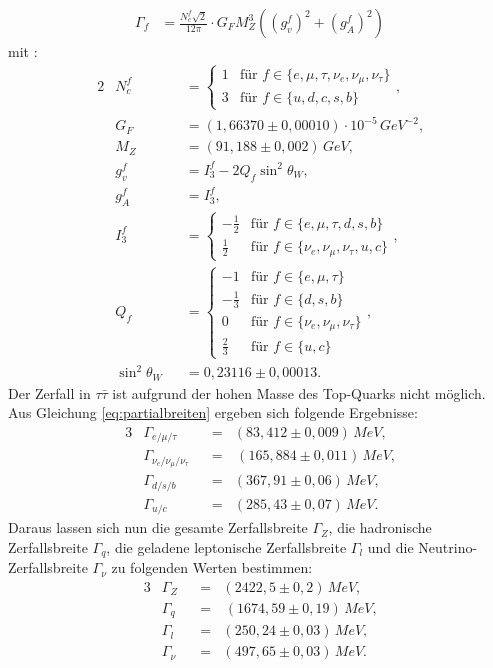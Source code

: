 \begin{align}
	\Gamma_f&=\frac{N_c^f\sqrt2}{12\pi}\cdot G_FM_Z^3\left(\left(g_v^f\right)^2+\left(g_A^f\right)^2\right)\label{eq:partialbreiten}
\end{align}
mit \cite{anleitungalt,nakamura}:
\begin{alignat}{2}
	&N_c^f&&=
	\begin{cases}
		1&\text{für } f\in\{e, \mu, \tau, \nu_e, \nu_\mu, \nu_\tau\}\\
		3&\text{für } f\in\{u, d, c, s, b\}
	\end{cases}\text{,}\\
	&G_F&&=(1,66370\pm0,00010)\cdot10^{-5}\,\si{GeV^{-2}}\text{,}\\
	&M_Z&&=(91,188\pm0,002)\,\si{GeV}\text{,}\\
	&g_v^f&&=I_3^f-2Q_f\sin^2\theta_W\text{,}\\
	&g_A^f&&=I_3^f\text{,}\\
	&I_3^f&&=
	\begin{cases}
		-\frac12&\text{für } f\in\{e, \mu, \tau, d, s, b\}\\
		\frac12&\text{für } f\in\{\nu_e, \nu_\mu, \nu_\tau, u, c\}
	\end{cases}\text{,}\\
	&Q_f&&=
	\begin{cases}
		-1&\text{für } f\in\{e, \mu, \tau\}\\
		-\frac13&\text{für } f\in\{d, s, b\}\\
		0&\text{für } f\in\{\nu_e, \nu_\mu, \nu_\tau\}\\
		\frac23&\text{für } f\in\{u, c\}
	\end{cases}\text{,}\\
	&\sin^2\theta_W&&=0,23116\pm0,00013\text{.}
\end{alignat}
Der Zerfall in $\tau\bar\tau$ ist aufgrund der hohen Masse des Top-Quarks nicht möglich.\\

Aus Gleichung \ref{eq:partialbreiten} ergeben sich folgende Ergebnisse:
\begin{alignat}{3}
	&\Gamma_{e/\mu/\tau}&&=&(83,412\pm0,009)\,\si{MeV}\text{,}\label{eq:leptonenuniversalitaet}\\
	&\Gamma_{\nu_e/\nu_\mu/\nu_\tau}&&=&\,(165,884\pm0,011)\,\si{MeV}\text{,}\label{eq:neutrinos}\\
	&\Gamma_{d/s/b}&&=&(367,91\pm0,06)\,\si{MeV}\text{,}\\
	&\Gamma_{u/c}&&=&(285,43\pm0,07)\,\si{MeV}\text{.}
\end{alignat}
Daraus lassen sich nun die gesamte Zerfallsbreite $\Gamma_Z$, die hadronische Zerfallsbreite $\Gamma_q$, die geladene leptonische Zerfallsbreite $\Gamma_l$ und die Neutrino-Zerfallsbreite $\Gamma_\nu$ zu folgenden Werten bestimmen:
\begin{alignat}{3}
	&\Gamma_Z&&=&(2422,5\pm0,2)\,\si{MeV}\text{,}\\
	&\Gamma_q&&=&\,(1674,59\pm0,19)\,\si{MeV}\text{,}\\
	&\Gamma_l&&=&(250,24\pm0,03)\,\si{MeV}\text{,}\\
	&\Gamma_\nu&&=&(497,65\pm0,03)\,\si{MeV}\text{.}
\end{alignat}

